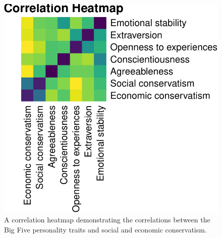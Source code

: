 \documentclass[man]{apa6}
\begin{document}
\begin{figure}
\centering
\includegraphics{manuscript_files/figure-latex/fig1-1.pdf}
\caption{\label{fig:fig1}A correlation heatmap demonstrating the correlations between the Big Five personality traits and social and economic conservatism.}
\end{figure}
\end{document}
